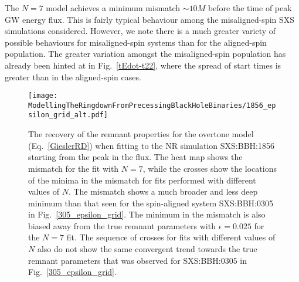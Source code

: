 The $N=7$ model achieves a minimum mismatch $\sim 10M$ before the time of peak GW energy flux. This is fairly typical behaviour among the misaligned-spin SXS simulations considered.
However, we note there is a much greater variety of possible behaviours for misaligned-spin systems than for the aligned-spin population. 
The greater variation amongst the misaligned-spin population has already been hinted at in Fig.~\ref{tEdot-t22}, where the spread of start times is greater than in the aligned-spin cases.

\begin{figure}[t]
    \centering
    \texttt{[image: ModellingTheRingdownFromPrecessingBlackHoleBinaries/1856\_epsilon\_grid\_alt.pdf]}
    \caption[Recovery of the SXS:BBH:1856 remnant properties using an overtone model starting from the peak of the GW energy flux]{
    The recovery of the remnant properties for the overtone model (Eq.~\ref{GieslerRD}) when fitting to the NR simulation SXS:BBH:1856 starting from the peak in the flux.
    The heat map shows the mismatch for the fit with $N=7$, while the crosses show the locations of the minima in the mismatch for fits performed with different values of $N$.
    The mismatch shows a much broader and less deep minimum than that seen for the spin-aligned system SXS:BBH:0305 in Fig.~\ref{305_epsilon_grid}.
    The minimum in the mismatch is also biased away from the true remnant parameters with $\epsilon=0.025$ for the $N=7$ fit.
    The sequence of crosses for fits with different values of $N$ also do not show the same convergent trend towards the true remnant parameters that was observed for SXS:BBH:0305 in Fig.~\ref{305_epsilon_grid}.
	}
	\label{1856_epsilon_grid}
\end{figure}

